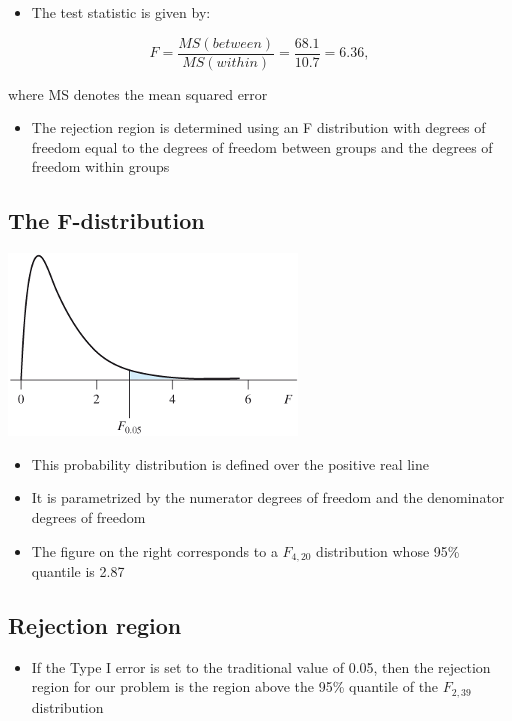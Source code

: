 \documentclass[
]{book}
\providecommand{\tightlist}{%
  \setlength{\itemsep}{0pt}\setlength{\parskip}{0pt}}
\begin{document}
\begin{itemize}
\tightlist
\item
  The test statistic is given by:
\end{itemize}

\[F=\frac{MS(between)}{MS(within)}=\frac{68.1}{10.7}=6.36,\]

where MS denotes the mean squared error

\begin{itemize}
\tightlist
\item
  The rejection region is determined using an F distribution with degrees of freedom equal to the degrees of freedom between groups and the degrees of freedom within groups
\end{itemize}

\hypertarget{the-f-distribution}{%
\subsection{The F-distribution}\label{the-f-distribution}}

\includegraphics[width=0.5\linewidth]{./10_35}

\begin{itemize}
\tightlist
\item
  This probability distribution is defined over the positive real line
\item
  It is parametrized by the numerator degrees of freedom and the denominator degrees of freedom
\item
  The figure on the right corresponds to a \(F_{4,20}\) distribution whose 95\% quantile is 2.87
\end{itemize}

\hypertarget{rejection-region}{%
\subsection{Rejection region}\label{rejection-region}}

\begin{itemize}
\tightlist
\item
  If the Type I error is set to the traditional value of 0.05, then the rejection region for our problem is the region above the 95\% quantile of the \(F_{2,39}\) distribution
\end{itemize}
\end{document}
